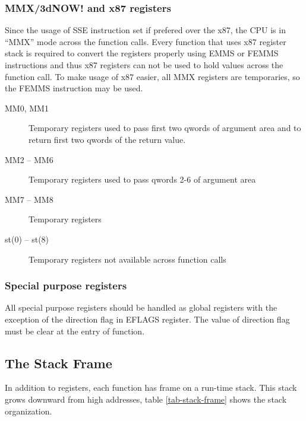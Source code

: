 \subsubsection {MMX/3dNOW! and x87 registers}
Since the usage of SSE instruction set if prefered over the x87, the CPU is in
``MMX'' mode across the function calls. Every function that uses x87 register
stack is required to convert the registers properly using EMMS or FEMMS
instructions and thus x87 registers can not be used to hold values across the
function call.  To make usage of x87 easier, all MMX registers are temporaries,
so the FEMMS instruction may be used.
\begin{description}
\item [MM0, MM1] Temporary registers used to pass first two qwords of argument area and
to return first two qwords of the return value.
\item [MM2 -- MM6] Temporary registers used to pass qwords 2-6 of argument area
\item [MM7 -- MM8] Temporary registers
\item [st(0) -- st(8)] Temporary registers not available across function calls
\end{description}


\subsubsection {Special purpose registers}
All special purpose registers should be handled as global registers with
the exception of the direction flag in EFLAGS register.  The value of direction
flag must be clear at the entry of function.

\subsection{The Stack Frame}
In addition to registers, each function has frame on a run-time stack.  This
stack grows downward from high addresses, table \ref{tab-stack-frame} shows the
stack organization.

